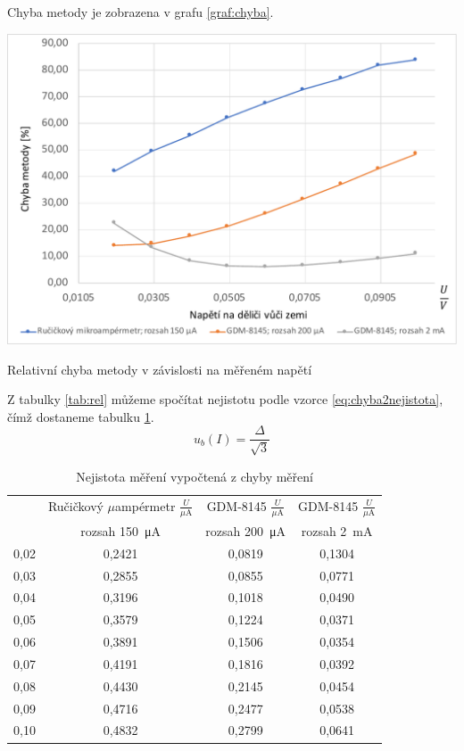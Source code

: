 \documentclass[a4paper,12pt]{article}   %
\newcommand{\tmu}{$\mu$}
\begin{document}
Chyba metody je zobrazena v grafu \ref{graf:chyba}.
\begin{graf}
    \centering
    \includegraphics[width=.8\textwidth]{graf_chyba.pdf}
    \caption{Relativní chyba metody v závislosti na měřeném napětí}
    \label{graf:chyba}
\end{graf}
Z tabulky \ref{tab:rel} můžeme spočítat nejistotu podle vzorce \ref{eq:chyba2nejistota}, čímž dostaneme tabulku \ref{tab:chyba2nejistota}.
\begin{equation}
    u_b(I)=\frac{\Delta}{\sqrt{3}}
    \label{eq:chyba2nejistota}
\end{equation}
\begin{table}[h!]
    \centering
    \begin{tabular}{|c|c|c|c|}
        \hline
        \rule{0pt}{2.5ex}
        \multirow{2}{*}{Napětí na děliči} &Ručičkový \tmu ampérmetr	$\frac{U}{\mu\textrm{A}}$&GDM-8145 	$\frac{U}{\mu\textrm{A}}$&GDM-8145 $\frac{U}{\mu\textrm{A}}$\\[.7ex]
        & rozsah  150~μA & rozsah 200~μA & rozsah  2~mA \\\hline\hline
        0,02 & 0,2421 & 0,0819 & 0,1304 & \\\hline
        0,03 & 0,2855 & 0,0855 & 0,0771 & \\\hline
        0,04 & 0,3196 & 0,1018 & 0,0490 & \\\hline
        0,05 & 0,3579 & 0,1224 & 0,0371 & \\\hline
        0,06 & 0,3891 & 0,1506 & 0,0354 & \\\hline
        0,07 & 0,4191 & 0,1816 & 0,0392 & \\\hline
        0,08 & 0,4430 & 0,2145 & 0,0454 & \\\hline
        0,09 & 0,4716 & 0,2477 & 0,0538 & \\\hline
        0,10 & 0,4832 & 0,2799 & 0,0641 & \\\hline
    \end{tabular}
    \caption{Nejistota měření vypočtená z chyby měření}
    \label{tab:chyba2nejistota}
\end{table}
\end{document}
